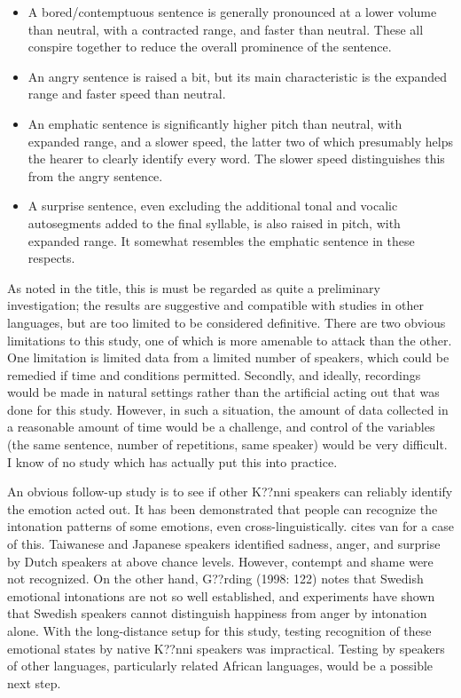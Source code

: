 \documentclass[output=paper]{langsci/langscibook}
\begin{document}
\begin{itemize}
\item A bored/contemptuous sentence is generally pronounced at a lower volume than neutral, with a contracted range, and faster than neutral. These all conspire together to reduce the overall prominence of the sentence.
\item An angry sentence is raised a bit, but its main characteristic is the expanded range and faster speed than neutral.
\item An emphatic sentence is significantly higher pitch than neutral, with expanded range, and a slower speed, the latter two of which presumably helps the hearer to clearly identify every word. The slower speed distinguishes this from the angry sentence.
\item A surprise sentence, even excluding the additional tonal and vocalic autosegments added to the final syllable, is also raised in pitch, with expanded range. It somewhat resembles the emphatic sentence in these respects. 
\end{itemize}

As noted in the title, this is must be regarded as quite a preliminary investigation; the results are suggestive and compatible with studies in other languages, but are too limited to be considered definitive. There are two obvious limitations to this study, one of which is more amenable to attack than the other. One limitation is limited data from a limited number of speakers, which could be remedied if time and conditions permitted. Secondly, and ideally, recordings would be made in natural settings rather than the artificial acting out that was done for this study. However, in such a situation, the amount of data collected in a reasonable amount of time would be a challenge, and control of the variables (the same sentence, number of repetitions, same speaker) would be very difficult. I know of no study which has actually put this into practice.

An obvious follow-up study is to see if other K??nni speakers can reliably identify the emotion acted out. It has been demonstrated that people can recognize the intonation patterns of some emotions, even cross-linguistically. \citet[72]{Gussenhoven2004} cites van \citet[128]{Bezooijen1984} for a case of this. Taiwanese and Japanese speakers identified sadness, anger, and surprise by Dutch speakers at above chance levels. However, contempt and shame were not recognized. On the other hand, G??rding (1998: 122) notes that Swedish emotional intonations are not so well established, and experiments have shown that Swedish speakers cannot distinguish happiness from anger by intonation alone. With the long-distance setup for this study, testing recognition of these emotional states by native K??nni speakers was impractical. Testing by speakers of other languages, particularly related African languages, would be a possible next step.
\end{document}
